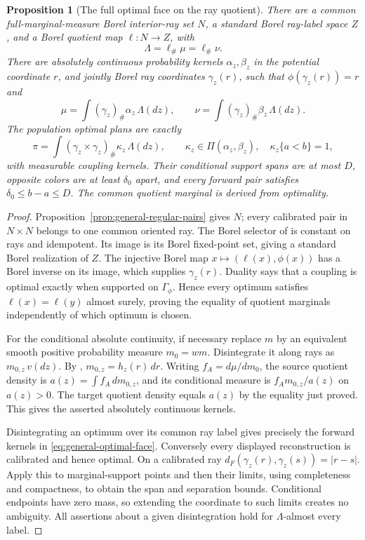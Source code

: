 \documentclass[11pt,reqno]{amsart}
\newtheorem{proposition}[theorem]{Proposition}
\theoremstyle{definition}
\theoremstyle{remark}
\numberwithin{equation}{section}
\begin{document}
\begin{proposition}[The full optimal face on the ray quotient]
\label{prop:general-optimal-face}
There are a common full-marginal-measure Borel interior-ray set \(N\),
a standard Borel ray-label space \(Z\), and a Borel quotient map
\(\ell:N\to Z\), with
\[
 \Lambda=\ell_\#\mu=\ell_\#\nu.
\]
There are absolutely continuous probability kernels
\(\alpha_z,\beta_z\) in the potential coordinate \(r\), and
jointly Borel ray coordinates \(\gamma_z(r)\), such that
\(\phi(\gamma_z(r))=r\) and
\[
 \mu=\int(\gamma_z)_\#\alpha_z\,\Lambda(dz),\qquad
 \nu=\int(\gamma_z)_\#\beta_z\,\Lambda(dz).
\]
The population optimal plans are exactly
\begin{equation}
\label{eq:general-optimal-face}
 \pi=\int(\gamma_z\times\gamma_z)_\#\kappa_z\,\Lambda(dz),
 \qquad \kappa_z\in\Pi(\alpha_z,\beta_z),\quad
 \kappa_z\{a<b\}=1,
\end{equation}
with measurable coupling kernels. Their conditional support spans are
at most \(D\), opposite colors are at least \(\delta_0\) apart,
and every forward pair satisfies \(\delta_0\le b-a\le D\).
The common quotient marginal is derived from optimality.
\end{proposition}
\begin{proof}
Proposition~\ref{prop:general-regular-pairs} gives \(N\); every
calibrated pair in \(N\times N\) belongs to one common oriented ray.
The Borel selector of \cite[Lemmas~4.10--4.11]{OhtaNeedles} is
constant on rays and idempotent. Its image is its Borel fixed-point
set, giving a standard Borel realization of \(Z\).
The injective Borel map \(x\mapsto(\ell(x),\phi(x))\) has a
Borel inverse on its image, which supplies \(\gamma_z(r)\).
Duality says that a coupling is optimal exactly when supported on
\(\Gamma_\phi\). Hence every optimum satisfies
\(\ell(x)=\ell(y)\) almost surely, proving the equality of quotient
marginals independently of which optimum is chosen.

For the conditional absolute continuity, if necessary replace \(m\)
by an equivalent smooth positive probability measure \(m_0=w m\).
Disintegrate it along rays as \(m_{0,z}\,v(dz)\).
By \cite[Theorem~1.1(i),(ii)]{OhtaNeedles},
\(m_{0,z}=h_z(r)\,dr\). Writing \(f_A=d\mu/dm_0\), the
source quotient density is \(a(z)=\int f_A\,dm_{0,z}\), and its
conditional measure is \(f_A m_{0,z}/a(z)\) on \(a(z)>0\).
The target quotient density equals \(a(z)\) by the equality just
proved. This gives the asserted absolutely continuous kernels.

Disintegrating an optimum over its common ray label gives precisely
the forward kernels in \eqref{eq:general-optimal-face}. Conversely
every displayed reconstruction is calibrated and hence optimal.
On a calibrated ray \(d_F(\gamma_z(r),\gamma_z(s))=|r-s|\).
Apply this to marginal-support points and then their limits, using
completeness and compactness, to obtain the span and separation bounds.
Conditional endpoints have zero mass, so extending the coordinate to
such limits creates no ambiguity. All assertions about a given
disintegration hold for \(\Lambda\)-almost every label.
\end{proof}
\end{document}
